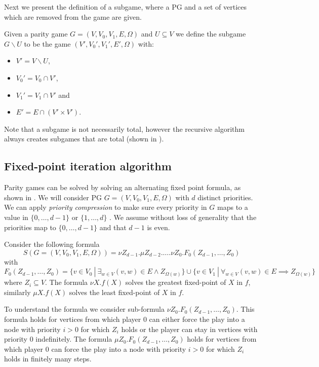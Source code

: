 Next we present the definition of a subgame, where a PG and a set of vertices which are removed from the game are given.

\begin{definition}\cite{ZIELONKA1998135}
	\label{def_org_subgame}
	Given a parity game $G = (V,V_0,V_1, E,\Omega)$ and $U \subseteq V$ we define the subgame $G \backslash U$ to be the game $(V', V_0', V_1', E', \Omega)$ with:
	\begin{itemize}
		\item $V' = V \backslash U$,
		\item $V_0' = V_0 \cap V'$,
		\item $V_1' = V_1 \cap V'$ and
		\item $E' = E \cap (V' \times V')$.
	\end{itemize}
\end{definition}

Note that a subgame is not necessarily total, however the recursive algorithm always creates subgames that are total (shown in \cite{ZIELONKA1998135}).

\subsection{Fixed-point iteration algorithm}
Parity games can be solved by solving an alternating fixed point formula, as shown in \cite{WALUKIEWICZ2002311}. We will consider PG $G = (V,V_0,V_1, E, \Omega)$ with $d$ distinct priorities. We can apply \textit{priority compression} to make sure every priority in $G$ maps to a value in $\{0,\dots,d-1\}$ or $\{1, \dots, d\}$ \cite{SolvingInPractice,FPITE}. We assume without loss of generality that the priorities map to $\{0,\dots,d-1\}$ and that $d-1$ is even. 

Consider the following formula
\[ S(G = (V,V_0,V_1,E,\Omega)) = \nu Z_{d-1}. \mu Z_{d-2}. \dots . \nu Z_0. F_0(Z_{d-1},\dots,Z_0) \]
with
\[ F_0(Z_{d-1},\dots,Z_0) = \{ v \in V_0\ |\ \exists_{w\in V} (v,w) \in E \wedge Z_{\Omega(w)} \} \cup \{ v \in V_1\ |\ \forall_{w\in V} (v,w) \in E \implies Z_{\Omega(w)} \} \]
where $Z_i \subseteq V$. The formula $\nu X. f(X)$ solves the greatest fixed-point of $X$ in $f$, similarly $\mu X.f(X)$ solves the least fixed-point of $X$ in $f$.

To understand the formula we consider sub-formula $\nu Z_0. F_0(Z_{d-1},\dots,Z_0)$. This formula holds for vertices from which player $0$ can either force the play into a node with priority $i > 0$ for which $Z_i$ holds or the player can stay in vertices with priority $0$ indefinitely. The formula $\mu Z_0. F_0(Z_{d-1},\dots,Z_0)$ holds for vertices from which player $0$ can force the play into a node with priority $i > 0$ for which $Z_i$ holds in finitely many steps.

